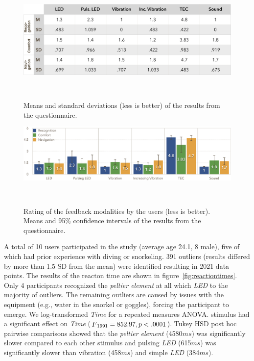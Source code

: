 \begin{figure}
	\includegraphics[width=\columnwidth]{images/m_sd_table_noranking}
	\caption{Means and standard deviations (less is better) of the results from the questionnaire.}~\label{fig:m_sd_table}
\end{figure}

\begin{figure}
	\includegraphics[width=\columnwidth]{images/GraphQuestionnaireNoranking.png}
	\caption{Rating of the feedback modalities by the users (less is better). Means and 95\% confidence intervals of the results from the questionnaire.}~\label{fig:questionnaire}
\end{figure}

A total of 10 users participated in the study (average age 24.1, 8 male), five of which had prior experience with diving or snorkeling. 
391 outliers (results differed by more than 1.5 SD from the mean) were identified resulting in 2021 data points.
The results of the reacton time are shown in figure~\ref{fig:reactiontimes}.
Only 4 participants recognized the \emph{peltier element} at all which \emph{LED} to the majority of outliers. 
The remaining outliers are caused by issues with the equipment (e.g., water in the snorkel or goggles), forcing the participant to emerge.
We log-transformed \emph{Time} for a repeated measures ANOVA. 
{\sc stimulus} had a significant effect on \emph{Time} ($F\textsubscript{1991} = 852.97, p<.0001$). 
Tukey HSD post hoc pairwise comparisons showed that the \emph{peltier element} (4580$ms$) was significantly slower compared to each other {\sc stimulus} and pulsing \emph{LED} (615$ms$) was significantly slower than vibration (458$ms$) and simple \emph{LED} (384$ms$).

